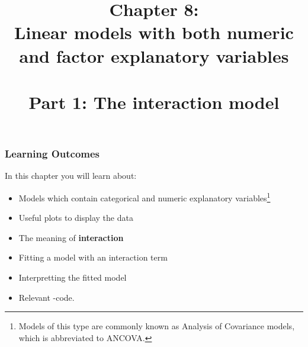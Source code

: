 \documentclass{beamer}\usepackage[]{graphicx}\usepackage[]{xcolor}
\begin{document}
\newcommand{\thechapter}{8}

\title{Chapter 8: \\ Linear models with both numeric and factor explanatory variables \\~\\ Part 1: The interaction model}


\begin{frame}
\titlepage
\end{frame}


\begin{frame}[t]
\frametitle{Learning Outcomes}
In this chapter you will learn about:
\begin{center}
\vspace{16pt}
  \begin{itemize}
  \item Models which contain categorical and numeric explanatory variables\footnote{Models of this type are commonly known as Analysis of Covariance models, which is abbreviated to ANCOVA. }
    \item Useful plots to display the data
    \item The meaning of {\bf interaction}
    \item Fitting a model with an interaction term
    \item Interpretting the fitted model
    \item Relevant -code.
  \end{itemize}
\end{center}

\end{frame}


\end{document}
